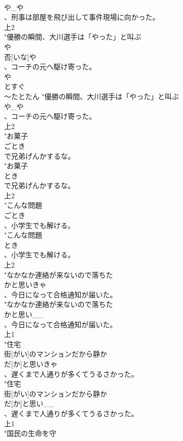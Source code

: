 \documentclass[8pt]{extreport}
\begin{document}
\begin{CJK}{UTF8}{min}
\\	や_や
\\	、刑事は部屋を飛び出して事件現場に向かった。
\\	上2
\\	"優勝の瞬間、大川選手は「やった」と叫ぶ
\\	や
\\	否[いな]や
\\	、コーチの元へ駆け寄った。
\\	や
\\	とすぐ 
\\	～たとたん	"優勝の瞬間、大川選手は「やった」と叫ぶ
\\	や_や
\\	、コーチの元へ駆け寄った。
\\	上2
\\	"お菓子
\\	ごとき
\\	で兄弟げんかするな。
\\	"お菓子
\\	とき
\\	で兄弟げんかするな。
\\	上2
\\	"こんな問題
\\	ごとき
\\	、小学生でも解ける。
\\	"こんな問題
\\	とき
\\	、小学生でも解ける。
\\	上2
\\	"なかなか連絡が来ないので落ちた
\\	かと思いきゃ
\\	、今日になって合格通知が届いた。
\\	"なかなか連絡が来ないので落ちた
\\	かと思い__
\\	、今日になって合格通知が届いた。
\\	上1
\\	"住宅
\\	街[がい]のマンションだから静か
\\	だ[か]と思いきゃ
\\	、遅くまで人通りが多くてうるさかった。
\\	"住宅
\\	街[がい]のマンションだから静か
\\	だ[か]と思い__
\\	、遅くまで人通りが多くてうるさかった。
\\	上1
\\	"国民の生命を守

\end{CJK}
\end{document}
